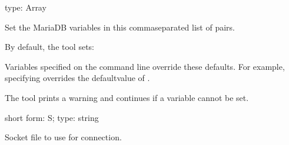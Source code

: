 \documentclass[letterpaper,10pt,english]{sphinxmanual}
\begin{document}

\begin{fulllineitems}
\label{\detokenize{mariadb-index-checker:cmdoption-mariadb-index-checker-set-vars}}
\sphinxAtStartPar
type: Array

\sphinxAtStartPar
Set the MariaDB variables in this comma\sphinxhyphen{}separated list of  pairs.

\sphinxAtStartPar
By default, the tool sets:

\begin{sphinxVerbatim}[commandchars=\\\{\}]
\end{sphinxVerbatim}

\sphinxAtStartPar
Variables specified on the command line override these defaults.  For
example, specifying  overrides the defaultvalue of .

\sphinxAtStartPar
The tool prints a warning and continues if a variable cannot be set.

\end{fulllineitems}


\begin{fulllineitems}
\label{\detokenize{mariadb-index-checker:cmdoption-mariadb-index-checker-socket}}
\sphinxAtStartPar
short form: \sphinxhyphen{}S; type: string

\sphinxAtStartPar
Socket file to use for connection.

\end{fulllineitems}
\end{document}
